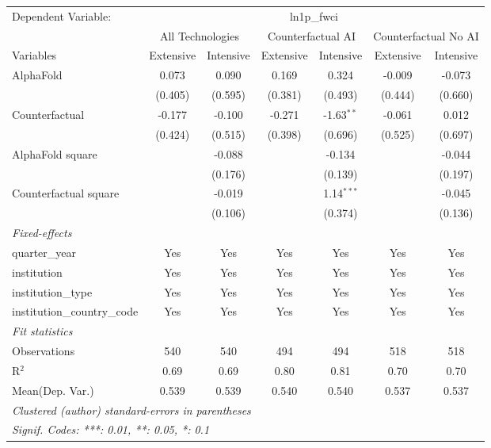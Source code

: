 \begingroup
\centering
\begin{tabular}{lcccccc}
   \tabularnewline \midrule \midrule
   Dependent Variable: & \multicolumn{6}{c}{ln1p\_fwci}\\
 & \multicolumn{2}{c}{All Technologies} & \multicolumn{2}{c}{Counterfactual AI} & \multicolumn{2}{c}{Counterfactual No AI} \\
\cmidrule(lr){1-1}\cmidrule(lr){2-3} \cmidrule(lr){4-5} \cmidrule(lr){6-7}
Variables & \multicolumn{1}{c}{Extensive} & \multicolumn{1}{c}{Intensive} & \multicolumn{1}{c}{Extensive} & \multicolumn{1}{c}{Intensive} & \multicolumn{1}{c}{Extensive} & \multicolumn{1}{c}{Intensive} \\
\cmidrule(lr){1-1}\cmidrule(lr){2-2} \cmidrule(lr){3-3} \cmidrule(lr){4-4} \cmidrule(lr){5-5} \cmidrule(lr){6-6} \cmidrule(lr){7-7}
   AlphaFold                    & 0.073   & 0.090   & 0.169   & 0.324        & -0.009  & -0.073\\   
                                & (0.405) & (0.595) & (0.381) & (0.493)      & (0.444) & (0.660)\\   
   Counterfactual               & -0.177  & -0.100  & -0.271  & -1.63$^{**}$ & -0.061  & 0.012\\   
                                & (0.424) & (0.515) & (0.398) & (0.696)      & (0.525) & (0.697)\\   
   AlphaFold square             &         & -0.088  &         & -0.134       &         & -0.044\\   
                                &         & (0.176) &         & (0.139)      &         & (0.197)\\   
   Counterfactual square        &         & -0.019  &         & 1.14$^{***}$ &         & -0.045\\   
                                &         & (0.106) &         & (0.374)      &         & (0.136)\\   
   \midrule
   \emph{Fixed-effects}\\
   quarter\_year                & Yes     & Yes     & Yes     & Yes          & Yes     & Yes\\  
   institution                  & Yes     & Yes     & Yes     & Yes          & Yes     & Yes\\  
   institution\_type            & Yes     & Yes     & Yes     & Yes          & Yes     & Yes\\  
   institution\_country\_code   & Yes     & Yes     & Yes     & Yes          & Yes     & Yes\\  
   \midrule
   \emph{Fit statistics}\\
   Observations                 & 540     & 540     & 494     & 494          & 518     & 518\\  
   R$^2$                        & 0.69    & 0.69    & 0.80    & 0.81         & 0.70    & 0.70\\  
Mean(Dep. Var.) & 0.539 & 0.539 & 0.540 & 0.540 & 0.537 & 0.537 \\
   \midrule \midrule
   \multicolumn{7}{l}{\emph{Clustered (author) standard-errors in parentheses}}\\
   \multicolumn{7}{l}{\emph{Signif. Codes: ***: 0.01, **: 0.05, *: 0.1}}\\
\end{tabular}
\par\endgroup
